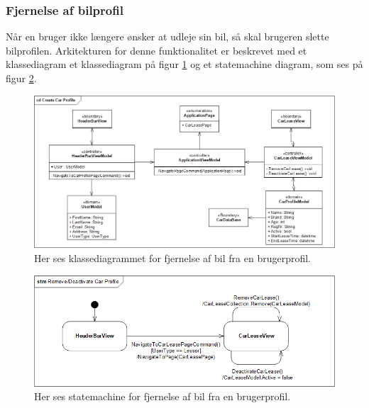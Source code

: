 \documentclass[Arkitektur/System_main.tex]{subfiles}
\begin{document}
\subsubsection{Fjernelse af bilprofil}
Når en bruger ikke længere ønsker at udleje sin bil, så skal brugeren slette bilprofilen. Arkitekturen for denne funktionalitet er beskrevet med et klassediagram et klassediagram på figur \ref{fig:RemoveDeactivateCarProfileCD} og et statemachine diagram, som ses på figur \ref{fig:RemoveDeactivateCarProfileSTM}.
\begin{figure}[H]
    \centering
    \includegraphics[width=1\textwidth]{Arkitektur/Softwarearkitektur/Car_registration/graphics/RemoveDeactivateCarProfileCD.png}
    \caption{Her ses klassediagrammet for fjernelse af bil fra en brugerprofil. }
    \label{fig:RemoveDeactivateCarProfileCD}
\end{figure}

\begin{figure}[H]
    \centering
    \includegraphics[width=1\textwidth]{Arkitektur/Softwarearkitektur/Car_registration/graphics/RemoveDeactivateCarProfileSTM.png}
    \caption{Her ses statemachine for fjernelse af bil fra en brugerprofil. }
    \label{fig:RemoveDeactivateCarProfileSTM}
\end{figure}
\end{document}
